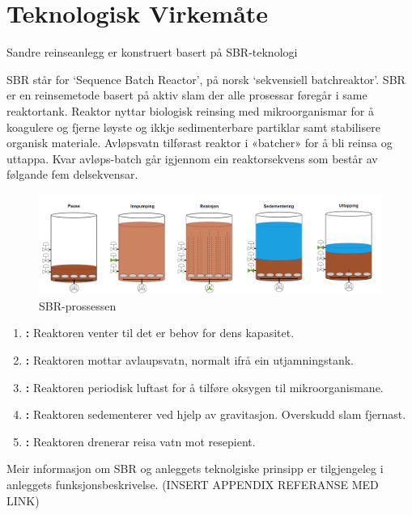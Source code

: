\section{Teknologisk Virkemåte}
\thispagestyle{fancy}
Sandre reinseanlegg er konstruert basert på SBR-teknologi

SBR står for `Sequence Batch Reactor', på norsk `sekvensiell batchreaktor'.\newline
SBR er en reinsemetode basert på aktiv slam der alle prosessar føregår i same reaktortank. 
Reaktor nyttar biologisk reinsing med mikroorganismar for å koagulere 
og fjerne løyste og ikkje sedimenterbare partiklar samt stabilisere organisk materiale. 
Avløpsvatn tilførast reaktor i «batcher» for å bli reinsa og uttappa. 
Kvar avløps-batch går igjennom ein reaktorsekvens som består av følgande fem delsekvensar.
\newline

\begin{figure}[htbp]
    \centering
    \includegraphics[width=1\textwidth]{Figurar/SBR-V2.png}
    \caption{SBR-prossessen}\label{fig:HMI}
\end{figure}


\begin{enumerate}
    \item \textbf{:} Reaktoren venter til det er behov for dens kapasitet.
    \item \textbf{:} Reaktoren mottar avlaupsvatn, normalt ifrå ein utjamningstank.
    \item \textbf{:} Reaktoren periodisk luftast for å tilføre oksygen til mikroorganismane.
    \item \textbf{:} Reaktoren sedementerer ved hjelp av gravitasjon. Overskudd slam fjernast.
    \item \textbf{:} Reaktoren drenerar reisa vatn mot resepient.
\end{enumerate}



Meir informasjon om SBR og anleggets teknolgiske prinsipp er tilgjengeleg i anleggets
funksjonsbeskrivelse. (INSERT APPENDIX REFERANSE MED LINK)

